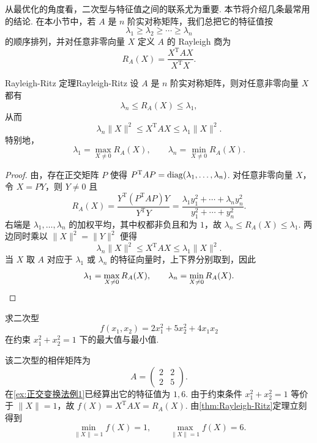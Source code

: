 从最优化的角度看，二次型与特征值之间的联系尤为重要. 本节将介绍几条最常用的结论. 在本小节中，若 $A$ 是 $n$ 阶实对称矩阵，我们总把它的特征值按
\[
    \lambda_1\geqslant \lambda_2\geqslant \cdots \geqslant \lambda_n
\]
的顺序排列，并对任意非零向量 $X$ 定义 $A$ 的 Rayleigh 商为
\[
    R_A(X)=\frac{X^\mathrm{T}AX}{X^\mathrm{T}X}.
\]

\begin{theorem}{Rayleigh-Ritz 定理}{Rayleigh-Ritz}
    设 $A$ 是 $n$ 阶实对称矩阵，则对任意非零向量 $X$ 都有
    \[
        \lambda_n\leqslant R_A(X)\leqslant \lambda_1,
    \]
    从而
    \[
        \lambda_n\|X\|^2\leqslant X^\mathrm{T}AX\leqslant \lambda_1\|X\|^2.
    \]
    特别地，
    \[
        \lambda_1=\max_{X\neq 0}R_A(X), \qquad \lambda_n=\min_{X\neq 0}R_A(X).
    \]
\end{theorem}

\begin{proof}
    由，存在正交矩阵 $P$ 使得 $P^\mathrm{T}AP=\operatorname{diag}(\lambda_1,\ldots,\lambda_n)$. 对任意非零向量 $X$，令 $X=PY$，则 $Y\neq 0$ 且
    \[
        R_A(X)=\frac{Y^\mathrm{T}(P^\mathrm{T}AP)Y}{Y^\mathrm{T}Y}
        =\frac{\lambda_1y_1^2+\cdots+\lambda_ny_n^2}{y_1^2+\cdots+y_n^2}.
    \]
    右端是 $\lambda_1,\ldots,\lambda_n$ 的加权平均，其中权都非负且和为 $1$，故 $\lambda_n\leqslant R_A(X)\leqslant \lambda_1$. 两边同时乘以 $\|X\|^2=\|Y\|^2$ 便得
    \[
        \lambda_n\|X\|^2\leqslant X^\mathrm{T}AX\leqslant \lambda_1\|X\|^2.
    \]
    当 $X$ 取 $A$ 对应于 $\lambda_1$ 或 $\lambda_n$ 的特征向量时，上下界分别取到，因此
    \[
        \lambda_1=\max_{X\neq 0}R_A(X), \qquad \lambda_n=\min_{X\neq 0}R_A(X). \qedhere
    \]
\end{proof}

\begin{example}{}{}
    求二次型
    \[
        f(x_1,x_2)=2x_1^2+5x_2^2+4x_1x_2
    \]
    在约束 $x_1^2+x_2^2=1$ 下的最大值与最小值.
\end{example}

\begin{solution}
    该二次型的相伴矩阵为
    \[
        A=\begin{pmatrix}
            2 & 2 \\
            2 & 5
        \end{pmatrix}.
    \]
    在\autoref{ex:正交变换法例1}已经算出它的特征值为 $1,6$. 由于约束条件 $x_1^2+x_2^2=1$ 等价于 $\|X\|=1$，故 $f(X)=X^\mathrm{T}AX=R_A(X)$. 由\autoref{thm:Rayleigh-Ritz}定理立刻得到
    \[
        \min_{\|X\|=1}f(X)=1,\qquad \max_{\|X\|=1}f(X)=6.
    \]
\end{solution}

